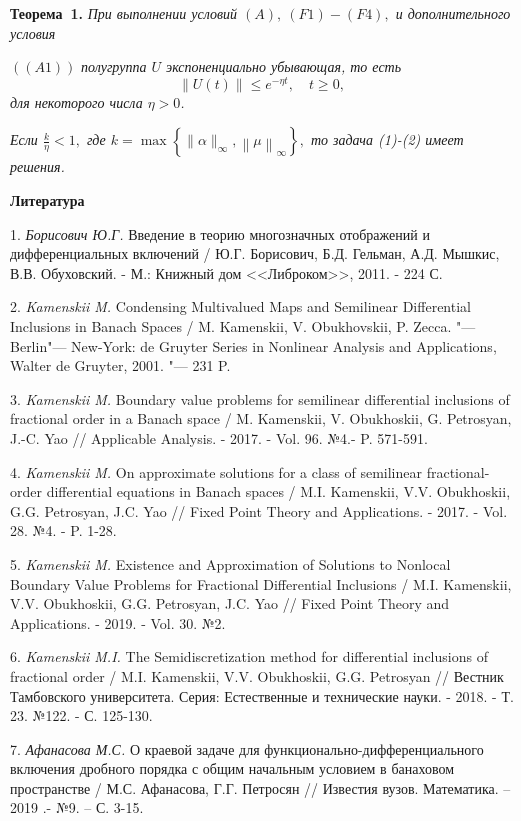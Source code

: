 \textbf{Теорема~1.} {\it При выполнении условий $(A),\ (F1) - (F4),$ и дополнительного условия}

$((A1))$ {\it полугруппа $U$ экспоненциально убывающая, то есть
$$\left\|U(t)\right\|\leq e^{-\eta t}, \quad t \geq 0,$$
для некоторого числа $\eta > 0$.}

{\it Если $\frac{k}{\eta} < 1,$ где $k=\max\left\{\|\alpha\|_\infty, \left\|\mu\right\|_{\infty}\right\},$ то задача (1)-(2) имеет решения.}


\smallskip \centerline {\bf Литература} \nopagebreak

1. {\it Борисович Ю.Г.} Введение в теорию многозначных отображений и дифференциальных включений / Ю.Г. Борисович, Б.Д. Гельман, А.Д. Мышкис, В.В. Обуховский. - М.: Книжный дом <<Либроком>>, 2011. - 224 С.

2. {\it Kamenskii M.} Condensing Multivalued Maps and Semili\-ne\-ar Differential Inc\-lu\-sions in Banach Spaces / M. Kamenskii, V. Obukhovskii, P. Zecca. "--- Berlin"--- New-York: de Gruyter Series in Nonlinear Analysis and Appli\-ca\-tions, Walter de Gruyter, 2001. "--- 231 P.

3. {\it Kamenskii M.}  Boundary value problems for semilinear differential inclusions of fractional order in a Banach space / M.  Kamenskii, V. Obukhoskii, G. Petrosyan, J.-C. Yao //  Applicable Analysis. - 2017. - Vol. 96. №4.- P. 571-591.

4. {\it Kamenskii M.}  On approximate solutions for a class of semilinear fractional-order differential equations in Banach spaces / M.I. Kamenskii, V.V. Obukhoskii, G.G. Petrosyan, J.C. Yao // Fixed Point Theory and Applications. - 2017. - Vol. 28. №4. -  P. 1-28.

5.	{\it Kamenskii M.}  Existence and Approximation of Solutions to Nonlocal Boundary Value Problems for  Fractional Differential Inclusions / M.I. Kamenskii, V.V. Obukhoskii, G.G. Petrosyan, J.C. Yao // Fixed Point Theory and Applications. - 2019. - Vol. 30. №2.

6. {\it Kamenskii M.I.} The Semidiscretization method for dif\-fe\-ren\-tial inc\-lu\-si\-ons of fractional order / M.I. Kamenskii, V.V. Obukhoskii, G.G. Petrosyan // Вестник Тамбовского университета. Серия: Естественные и технические науки. - 2018. - Т. 23. №122. -  С. 125-130.

7. {\it Афанасова М.С.} О краевой задаче для функционально-диффе\-рен\-циального включения дробного порядка с общим начальным условием  в банаховом пространстве / М.С. Афанасова, Г.Г. Петросян // Известия вузов. Математика. – 2019 .- №9. – С. 3-15.

